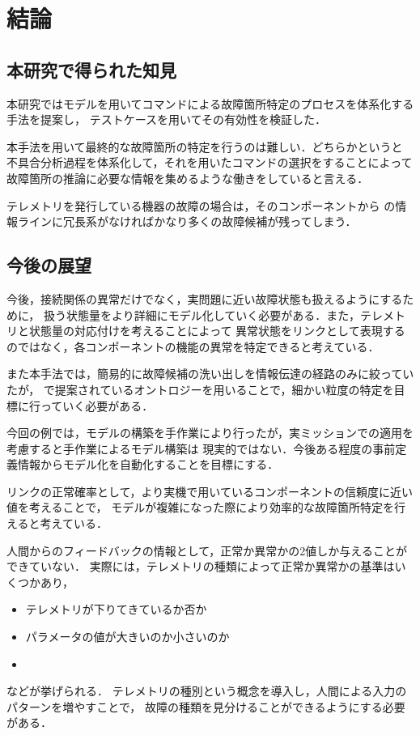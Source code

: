\documentclass[11pt]{jsreport}
\begin{document}
\fi

\chapter{結論}

\section{本研究で得られた知見}%
本研究ではモデルを用いてコマンドによる故障箇所特定のプロセスを体系化する手法を提案し，
テストケースを用いてその有効性を検証した．

  本手法を用いて最終的な故障箇所の特定を行うのは難しい．どちらかというと
  不具合分析過程を体系化して，それを用いたコマンドの選択をすることによって
  故障箇所の推論に必要な情報を集めるような働きをしていると言える．

  テレメトリを発行している機器の故障の場合は，そのコンポーネントから
  の情報ラインに冗長系がなければかなり多くの故障候補が残ってしまう．

  \section{今後の展望}
 今後，接続関係の異常だけでなく，実問題に近い故障状態も扱えるようにするために，
 扱う状態量をより詳細にモデル化していく必要がある．また，テレメトリと状態量の対応付けを考えることによって
 異常状態をリンクとして表現するのではなく，各コンポーネントの機能の異常を特定できると考えている．

 また本手法では，簡易的に故障候補の洗い出しを情報伝達の経路のみに絞っていたが，
 \cite{}で提案されているオントロジーを用いることで，細かい粒度の特定を目標に行っていく必要がある．

 今回の例では，モデルの構築を手作業により行ったが，実ミッションでの適用を考慮すると手作業によるモデル構築は
 現実的ではない．今後ある程度の事前定義情報からモデル化を自動化することを目標にする．
  
 リンクの正常確率として，より実機で用いているコンポーネントの信頼度に近い値を考えることで，
 モデルが複雑になった際により効率的な故障箇所特定を行えると考えている．

 人間からのフィードバックの情報として，正常か異常かの2値しか与えることができていない．
 実際には，テレメトリの種類によって正常か異常かの基準はいくつかあり，
\begin{itemize}
  \item テレメトリが下りてきているか否か
  \item パラメータの値が大きいのか小さいのか
  \item 
\end{itemize}
などが挙げられる．
テレメトリの種別という概念を導入し，人間による入力のパターンを増やすことで，
故障の種類を見分けることができるようにする必要がある．
\end{document}
